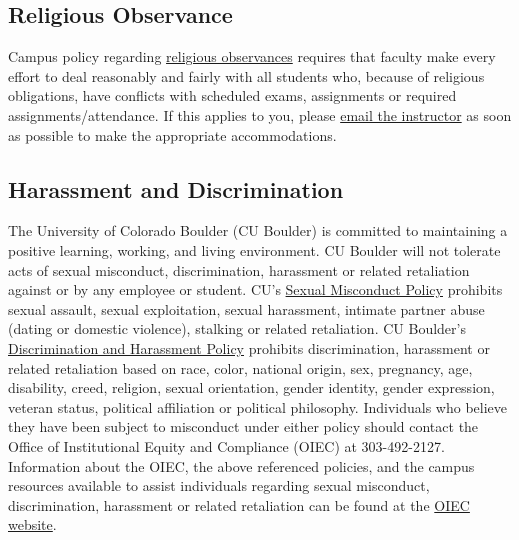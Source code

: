 \documentclass[11pt]{memoir}
\begin{document}
\subsection{Religious Observance}
Campus policy regarding \href{http://www.colorado.edu/policies/observance-religious-holidays-and-absences-classes-andor-exams}{religious observances} requires that faculty make every effort to deal reasonably and fairly with all students who, because of religious obligations, have conflicts with scheduled exams, assignments or required assignments/attendance. If this applies to you, please \href{mailto:brian.keegan@colorado.edu}{email the instructor} as soon as possible to make the appropriate accommodations.

\subsection{Harassment and Discrimination}
The University of Colorado Boulder (CU Boulder) is committed to maintaining a positive learning, working, and living environment. CU Boulder will not tolerate acts of sexual misconduct, discrimination, harassment or related retaliation against or by any employee or student. CU's \href{http://www.colorado.edu/policies/discrimination-and-harassment-policy-and-procedures}{Sexual Misconduct Policy} prohibits sexual assault, sexual exploitation, sexual harassment, intimate partner abuse (dating or domestic violence), stalking or related retaliation. CU Boulder's \href{http://www.colorado.edu/policies/discrimination-and-harassment-policy-and-procedures}{Discrimination and Harassment Policy} prohibits discrimination, harassment or related retaliation based on race, color, national origin, sex, pregnancy, age, disability, creed, religion, sexual orientation, gender identity, gender expression, veteran status, political affiliation or political philosophy. Individuals who believe they have been subject to misconduct under either policy should contact the Office of Institutional Equity and Compliance (OIEC) at 303-492-2127. Information about the OIEC, the above referenced policies, and the campus resources available to assist individuals regarding sexual misconduct, discrimination, harassment or related retaliation can be found at the \href{http://www.colorado.edu/institutionalequity/}{OIEC website}.
\end{document}
